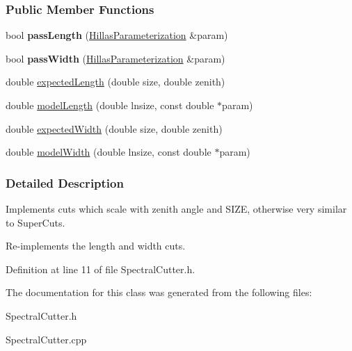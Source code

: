 \subsubsection*{Public Member Functions}
\begin{DoxyCompactItemize}
\item 
\hypertarget{classSpectralCutter_a86026e01fc73d62ba2e8d41816d07a00}{
bool {\bfseries passLength} (\hyperlink{structHillasParameterization}{HillasParameterization} \&param)}
\label{classSpectralCutter_a86026e01fc73d62ba2e8d41816d07a00}

\item 
\hypertarget{classSpectralCutter_a26ee21395280d5cf4ec6ceb6627ae4ad}{
bool {\bfseries passWidth} (\hyperlink{structHillasParameterization}{HillasParameterization} \&param)}
\label{classSpectralCutter_a26ee21395280d5cf4ec6ceb6627ae4ad}

\item 
\hypertarget{classSpectralCutter_ab4ea32e6db4899f1c82daa5ed6b4c9f6}{
double \hyperlink{classSpectralCutter_ab4ea32e6db4899f1c82daa5ed6b4c9f6}{expectedLength} (double size, double zenith)}
\label{classSpectralCutter_ab4ea32e6db4899f1c82daa5ed6b4c9f6}

\item 
\hypertarget{classSpectralCutter_af811b871a1f25c0ca09f8011aa993132}{
double \hyperlink{classSpectralCutter_af811b871a1f25c0ca09f8011aa993132}{modelLength} (double lnsize, const double $\ast$param)}
\label{classSpectralCutter_af811b871a1f25c0ca09f8011aa993132}

\item 
\hypertarget{classSpectralCutter_a841becd5a88abbfd5a942fcaa78ff1ac}{
double \hyperlink{classSpectralCutter_a841becd5a88abbfd5a942fcaa78ff1ac}{expectedWidth} (double size, double zenith)}
\label{classSpectralCutter_a841becd5a88abbfd5a942fcaa78ff1ac}

\item 
\hypertarget{classSpectralCutter_a474e8d284d8e60e13c4edb1be602bc3e}{
double \hyperlink{classSpectralCutter_a474e8d284d8e60e13c4edb1be602bc3e}{modelWidth} (double lnsize, const double $\ast$param)}
\label{classSpectralCutter_a474e8d284d8e60e13c4edb1be602bc3e}

\end{DoxyCompactItemize}


\subsubsection{Detailed Description}
Implements cuts which scale with zenith angle and SIZE, otherwise very similar to SuperCuts. 

Re-\/implements the length and width cuts. 

Definition at line 11 of file SpectralCutter.h.



The documentation for this class was generated from the following files:\begin{DoxyCompactItemize}
\item 
SpectralCutter.h\item 
SpectralCutter.cpp\end{DoxyCompactItemize}
